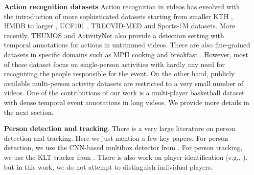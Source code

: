 \noindent \textbf{Action recognition datasets}
Action recognition in videos has eveolved with the introduction of more
sophisticated datasets starting from smaller KTH \cite{KTH}, HMDB \cite{HMDB}
to larger , UCF101 \cite{UCF101}, TRECVID-MED \cite{MED11} and Sports-1M \cite{Karpathy_CVPR14}
datasets.
More recently, THUMOS \cite{THUMOS} and ActivityNet \cite{ActivityNet} also provide a detection
setting with temporal annotations for actions in untrimmed videos.
There are also fine-grained datasets
in specific domains such as MPII cooking \cite{Finegrained_cooking} and breakfast \cite{Breakfast}.
However, most of these dataset focus on single-person activities with hardly
any need for recognizing the people responsible for the event. On the other
hand, publicly available multi-person activity datasets \cite{Choi_ICCV09,Ryoo_10,VIRAT} are restricted
to a very small number of videos.  One of the contributions of our work is 
a multi-player basketball dataset with dense temporal event annotations in
long videos. We provide more details in the next section.

\noindent \textbf{Person detection and tracking}. There is a very
large literature on person detection and tracking. Here we just
mention a few key papers.
For person detection, we use the CNN-based multibox detector from
\cite{Szegedy13}.
For person tracking, we use the KLT tracker from
\cite{Veenman_PAMI2001}.
There is also work on player identification (e.g., \cite{Lu2013}), but
in this work, we do not attempt to distinguish individual players.
